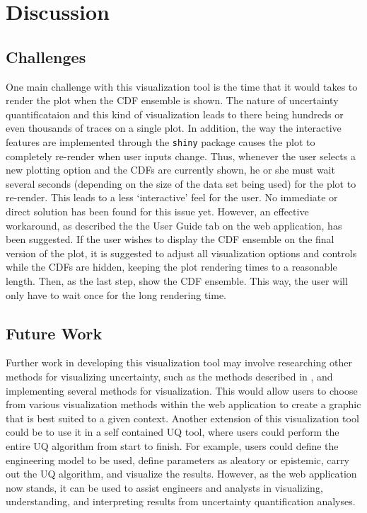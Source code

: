 \documentclass[11pt]{asaproc}\usepackage[]{graphicx}\usepackage[]{color}
\begin{document}
\section{Discussion}
\label{Discussion}

\subsection{Challenges}
One main challenge with this visualization tool is the time that it would takes to render the plot when the CDF ensemble is shown. The nature of uncertainty quantificataion and this kind of visualization leads to there being hundreds or even thousands of traces on a single plot. In addition, the way the interactive features are implemented through the {\tt shiny} package causes the plot to completely re-render when user inputs change. Thus, whenever the user selects a new plotting option and the CDFs are currently shown, he or she must wait several seconds (depending on the size of the data set being used) for the plot to re-render. This leads to a less `interactive' feel for the user. No immediate or direct solution has been found for this issue yet. However, an effective workaround, as described the the User Guide tab on the web application, has been suggested. If the user wishes to display the CDF ensemble on the final version of the plot, it is suggested to adjust all visualization options and controls while the CDFs are hidden, keeping the plot rendering times to a reasonable length. Then, as the last step, show the CDF ensemble. This way, the user will only have to wait once for the long rendering time.

\subsection{Future Work}
Further work in developing this visualization tool may involve researching other methods for visualizing uncertainty, such as the methods described in \cite{JA2008}, and implementing several methods for visualization. This would allow users to choose from various visualization methods within the web application to create a graphic that is best suited to a given context. Another extension of this visualization tool could be to use it in a self contained UQ tool, where users could perform the entire UQ algorithm from start to finish. For example, users could define the engineering model to be used, define parameters as aleatory or epistemic, carry out the UQ algorithm, and visualize the results. However, as the web application now stands, it can be used to assist engineers and analysts in visualizing, understanding, and interpreting results from uncertainty quantification analyses. 
\end{document}
